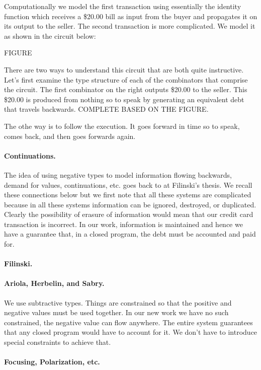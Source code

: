 \documentclass[preprint]{sigplanconf}
\begin{document}
Computationally we model the first transaction using essentially the identity
function which receives a \$20.00 bill as input from the buyer and propagates
it on its output to the seller. The second transaction is more
complicated. We model it as shown in the circuit below:

FIGURE

There are two ways to understand this circuit that are both quite
instructive. Let's first examine the type structure of each of the
combinators that comprise the circuit. The first combinator on the right
outputs \$20.00 to the seller. This \$20.00 is produced from nothing so to
speak by generating an equivalent debt that travels backwards. COMPLETE BASED
ON THE FIGURE.

The othe way is to follow the execution. It goes forward in time so to speak,
comes back, and then goes forwards again.

\paragraph*{Continuations.} The idea of using negative types to model
information flowing backwards, demand for values, continuations, etc. goes
back to at Filinski's thesis. We recall these connections below but we first
note that all these systems are complicated because in all these systems
information can be ignored, destroyed, or duplicated. Clearly the possibility
of erasure of information would mean that our credit card transaction is
incorrect. In our work, information is maintained and hence we have a
guarantee that, in a closed program, the debt must be accounted and paid for.

\paragraph*{Filinski.}


\paragraph*{Ariola, Herbelin, and Sabry.} We use subtractive types. Things
are constrained so that the positive and negative values must be used
together. In our new work we have no such constrained, the negative value can
flow anywhere. The entire system guarantees that any closed program would
have to account for it. We don't have to introduce special constraints to
achieve that.

\paragraph*{Focusing, Polarization, etc.}
\end{document}
